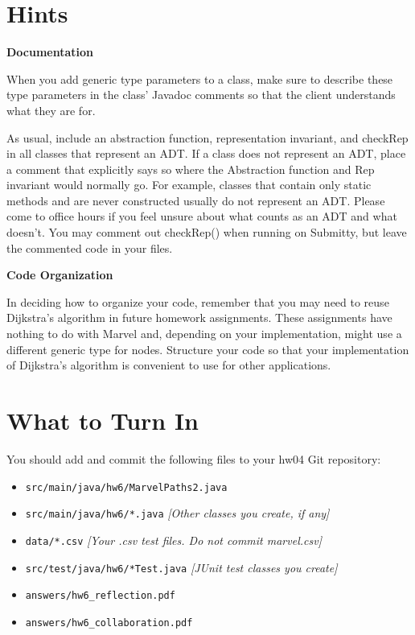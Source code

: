 \documentclass[11pt]{article}
\begin{document}
\newpage

\section*{Hints}
\label{sec:Hints}
\large{\textbf{Documentation}}

\noindent When you add generic type parameters to a class, make sure to describe these type parameters in the class' Javadoc comments so that the client understands what they are for.

\noindent As usual, include an abstraction function, representation invariant, and checkRep in all classes that represent an ADT. If a class does not represent an ADT, place a comment that explicitly says so where the Abstraction function and Rep invariant would normally go. For example, classes that contain only static methods and are never constructed usually do not represent an ADT. Please come to office hours if you feel unsure about what counts as an ADT and what doesn't. You may comment out checkRep() when running on Submitty, but leave the commented code in your files.

\noindent \large{\textbf{Code Organization}}

\noindent In deciding how to organize your code, remember that you may need to reuse Dijkstra's algorithm in future homework assignments. These assignments have nothing to do with Marvel and, depending on your implementation, might use a different generic type for nodes. Structure your code so that your implementation of Dijkstra's algorithm is convenient to use for other applications.

\section*{What to Turn In}
You should add and commit the following files to your hw04 Git repository:
\begin{itemize}
\item \texttt{src/main/java/hw6/MarvelPaths2.java}
\item \texttt{src/main/java/hw6/*.java} \textit{[Other classes you create, if any]}
\item \texttt{data/*.csv} \textit{[Your .csv test files. Do not commit marvel.csv]}
\item \texttt{src/test/java/hw6/*Test.java} \textit{[JUnit test classes you create]}
\item \texttt{answers/hw6\_reflection.pdf}
\item \texttt{answers/hw6\_collaboration.pdf}
\end{itemize}
\end{document}
